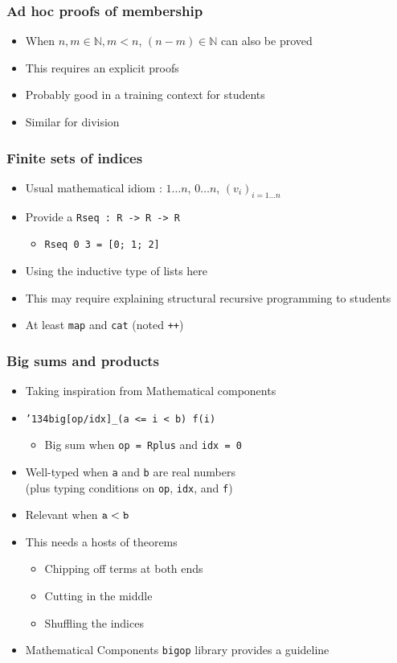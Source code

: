 \documentclass[compress]{beamer}
\begin{document}
\begin{frame}
\frametitle{Ad hoc proofs of membership}
\begin{itemize}
\item When \(n, m \in {\mathbb N}, m < n\), \((n - m) \in {\mathbb N}\) can
also be proved
\item This requires an explicit proofs
\item Probably good in a training context for students
\item Similar for division
\end{itemize}
\end{frame}
\begin{frame}
\frametitle{Finite sets of indices}
\begin{itemize}
\item Usual mathematical idiom : \(1 \ldots n\), \(0 \ldots n\), \((v_i)_{i = 1 \ldots n}\)
\item Provide a {\tt Rseq : R -> R -> R}
\begin{itemize}
\item {\tt Rseq 0 3 = [0; 1; 2]}
\end{itemize}
\item Using the inductive type of lists here
\item This may require explaining structural recursive programming to students
\item At least {\tt map} and {\tt cat} (noted {\tt ++})
\end{itemize}
\end{frame}
\begin{frame}
\frametitle{Big sums and products}
\begin{itemize}
\item Taking inspiration from Mathematical components
\item {\tt \char'134{}big[op/idx]\_(a <= i < b) f(i)}
\begin{itemize}
\item Big sum when {\tt op = Rplus} and {\tt idx = 0}
\end{itemize}
\item Well-typed when {\tt a} and {\tt b} are real numbers\\
 (plus typing conditions on {\tt op}, {\tt idx}, and {\tt f})
\item Relevant when \({\tt a} < {\tt b}\)
\item This needs a hosts of theorems
\begin{itemize}
\item Chipping off terms at both ends
\item Cutting in the middle
\item Shuffling the indices
\end{itemize}
\item Mathematical Components {\tt bigop} library provides a guideline
\end{itemize}
\end{frame}
\end{document}
